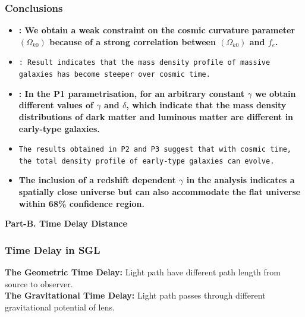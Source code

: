 \documentclass[xcolor=table,bigger]{beamer}
\begin{document}
\begin{frame}
 \frametitle{Conclusions}
 \begin{itemize}
 \item
 \textbf{\small {\color{red}{SIS model}}: We obtain a weak constraint on the cosmic curvature parameter $(\Omega_{k0})$ because of a strong correlation between $(\Omega_{k0})$ and $f_e$.}
 \item
\texttt{\small {\color{red}{PLS model}}: Result indicates that the mass density profile of massive galaxies has become steeper over cosmic time.}
\vspace{1mm}\\
\item
\textbf{\small {\color{red}{EPL model}}: In the P1 parametrisation, for an arbitrary constant $\gamma$ we obtain different values of $\gamma$ and $\delta$, which indicate that the mass density distributions of dark matter and luminous matter are different in early-type galaxies.}
\vspace{1mm}\\
\item
\texttt{\small The results obtained in P2 and P3 suggest that with cosmic time, the total density profile of early-type galaxies can evolve. }
\vspace{1mm}\\
\item
\textbf{\small The inclusion of a redshift dependent $\gamma$ in the analysis indicates a spatially close universe but can also accommodate the flat universe within 68\% confidence region.}

 \end{itemize}
 
 \end{frame}
\begin{frame}
\vspace{5mm}
\begin{center}
\textbf{Part-B. Time Delay Distance}
\end{center}
\end{frame} 
 \begin{frame}
  \frametitle{Time Delay in SGL}
  \vspace{4mm}
  \textbf{The Geometric Time Delay:} Light path have different path length from source to observer.
 \vspace{6mm}\\
   \textbf{The Gravitational Time Delay:} Light path passes through different gravitational potential of lens.
\vspace{6mm}
\begin{center}
\end{center}
\end{frame}
\end{document}
